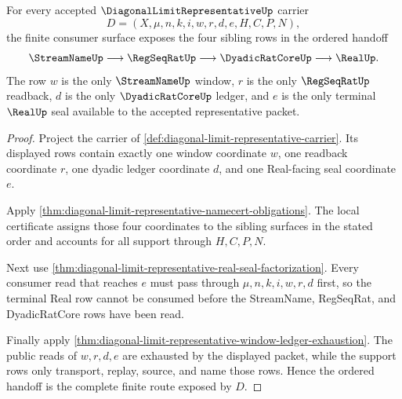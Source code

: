 \begin{theorem}
\label{thm:diagonal-limit-representative-carrier-handoff}
For every accepted $\DiagonalLimitRepresentativeUp$ carrier
$$
D=(X,\mu,n,k,i,w,r,d,e,H,C,P,N),
$$
the finite consumer surface exposes the four sibling rows in the ordered handoff
$$
\StreamNameUp \longrightarrow \RegSeqRatUp \longrightarrow \DyadicRatCoreUp \longrightarrow \RealUp.
$$
The row $w$ is the only $\StreamNameUp$ window, $r$ is the only $\RegSeqRatUp$ readback, $d$ is the only $\DyadicRatCoreUp$ ledger, and $e$ is the only terminal $\RealUp$ seal available to the accepted representative packet.
\end{theorem}
\begin{proof}
Project the carrier of \autoref{def:diagonal-limit-representative-carrier}. Its displayed rows contain exactly one window coordinate $w$, one readback coordinate $r$, one dyadic ledger coordinate $d$, and one Real-facing seal coordinate $e$.

Apply \autoref{thm:diagonal-limit-representative-namecert-obligations}. The local certificate assigns those four coordinates to the sibling surfaces in the stated order and accounts for all support through $H,C,P,N$.

Next use \autoref{thm:diagonal-limit-representative-real-seal-factorization}. Every consumer read that reaches $e$ must pass through $\mu,n,k,i,w,r,d$ first, so the terminal Real row cannot be consumed before the StreamName, RegSeqRat, and DyadicRatCore rows have been read.

Finally apply \autoref{thm:diagonal-limit-representative-window-ledger-exhaustion}. The public reads of $w,r,d,e$ are exhausted by the displayed packet, while the support rows only transport, replay, source, and name those rows. Hence the ordered handoff is the complete finite route exposed by $D$.
\end{proof}

